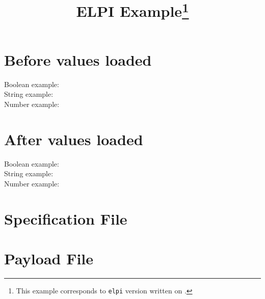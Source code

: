 \documentclass{article}
\begin{document}
    \title{ELPI Example\thanks{This example corresponds to \texttt{elpi} version \gitversion{} written on \gitdate.}}
    \author{\dogitauthors[\\]}
    \maketitle

    \begin{minipage}{.5\linewidth}
        \section*{Before values loaded}

        Boolean example:
        \\

        String example:
        \\

        Number example:
        \\
    \end{minipage}%
    \begin{minipage}{.5\linewidth}
        \section*{After values loaded}

        Boolean example:
        \\

        String example:
        \\

        Number example:
        \\
    \end{minipage}

    \section*{Specification File}
    


    \section*{Payload File}
    
\end{document}
